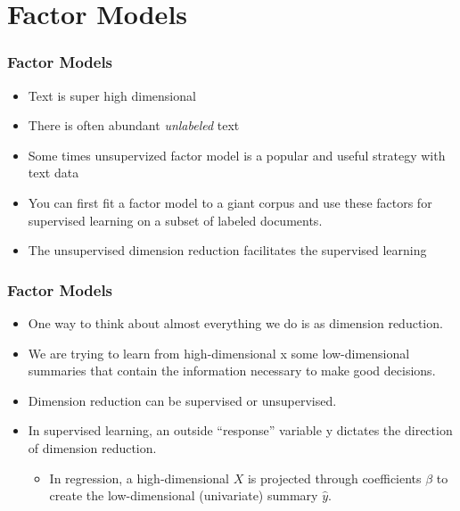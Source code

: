 \documentclass[
  shownotes,
  xcolor={svgnames},
  hyperref={colorlinks,citecolor=DarkBlue,linkcolor=DarkRed,urlcolor=DarkBlue}
  , aspectratio=169]{beamer}
\begin{document}
\section{Factor Models}
\begin{frame}
\frametitle{Factor Models}

\begin{itemize}
\item Text is super high dimensional
\medskip
\item There is often abundant {\it unlabeled} text
\medskip
\item Some times unsupervized factor model is a popular and useful strategy with text data
\medskip
\item You can first fit a factor model to a giant corpus and use these factors for supervised learning on a subset of labeled documents.
\medskip
\item The unsupervised dimension reduction facilitates the supervised learning
\end{itemize}
\end{frame}
\begin{frame}
\frametitle{Factor Models}

\begin{itemize}


\item One way to think about almost everything we do is as dimension reduction.
\medskip
 \item We are trying to learn from high-dimensional x some low-dimensional summaries that contain the information necessary to make good decisions. 
 \medskip
 \item Dimension reduction can be supervised or unsupervised.
  \medskip
 \item In supervised learning, an outside  “response” variable y dictates the direction of dimension reduction.
  \medskip
  \begin{itemize}
   \item  In regression, a high-dimensional $X$ is projected through coefficients $\beta$ to create the low-dimensional (univariate) summary $\hat y$. 
  \end{itemize}


\end{itemize}
\end{frame}
\end{document}
